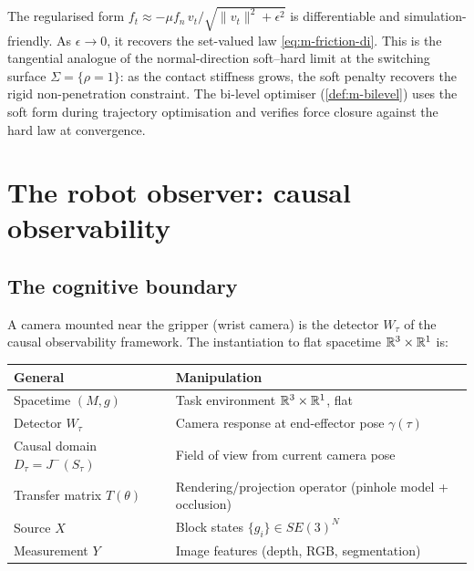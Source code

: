 \begin{remark}\label{rem:m-soft-hard}
The regularised form
$f_t \approx -\mu f_n\,v_t / \sqrt{\|v_t\|^2 + \epsilon^2}$
is differentiable and simulation-friendly.  As
$\epsilon \to 0$, it recovers the set-valued law
\eqref{eq:m-friction-di}.  This is the tangential analogue of
the normal-direction soft--hard limit at the switching surface
$\Sigma = \{\rho = 1\}$: as the contact stiffness grows,
the soft penalty recovers the rigid non-penetration constraint.
The bi-level optimiser (\cref{def:m-bilevel}) uses the soft
form during trajectory optimisation and verifies force closure
against the hard law at convergence.
\end{remark}


\section{The robot observer: causal observability}
\label{sec:m-observer}

\subsection{The cognitive boundary}

A camera mounted near the gripper (wrist camera) is the detector
$W_\tau$ of the causal observability framework.  The instantiation
to flat spacetime $\mathbb{R}^3 \times \mathbb{R}^1$ is:

\begin{center}
\begin{tabular}{@{}lp{8cm}@{}}
\toprule
\textbf{General} & \textbf{Manipulation} \\
\midrule
Spacetime $(M, g)$ & Task environment $\mathbb{R}^3 \times \mathbb{R}^1$, flat \\
Detector $W_\tau$ & Camera response at end-effector pose $\gamma(\tau)$ \\
Causal domain $D_\tau = J^-(S_\tau)$ & Field of view from current
  camera pose \\
Transfer matrix $T(\theta)$ & Rendering/projection operator (pinhole
  model + occlusion) \\
Source $X$ & Block states $\{g_i\} \in SE(3)^N$ \\
Measurement $Y$ & Image features (depth, RGB, segmentation) \\
\bottomrule
\end{tabular}
\end{center}

